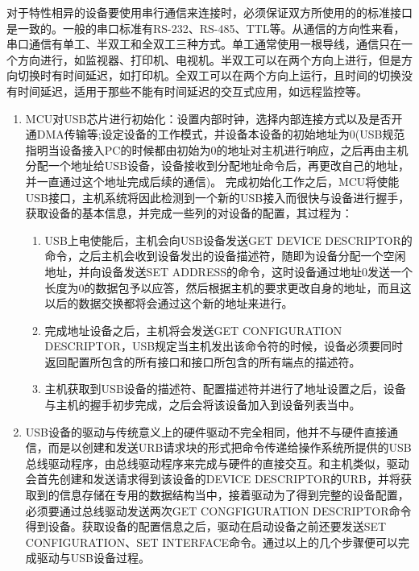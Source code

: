 {	对于特性相异的设备要使用串行通信来连接时，必须保证双方所使用的的标准接口是一致的。一般的串口标准有RS-232、RS-485、TTL等。从通信的方向性来看，串口通信有单工、半双工和全双工三种方式。单工通常使用一根导线，通信只在一个方向进行，如监视器、打印机、电视机。半双工可以在两个方向上进行，但是方向切换时有时间延迟，如打印机。全双工可以在两个方向上运行，且时间的切换没有时间延迟，适用于那些不能有时间延迟的交互式应用，如远程监控等。






\begin{enumerate}
\item {}

	MCU对USB芯片进行初始化：设置内部时钟，选择内部连接方式以及是否开通DMA传输等;设定设备的工作模式，并设备本设备的初始地址为0(USB规范指明当设备接入PC的时候都由初始为0的地址对主机进行响应，之后再由主机分配一个地址给USB设备，设备接收到分配地址命令后，再更改自己的地址，并一直通过这个地址完成后续的通信)。
	完成初始化工作之后，MCU将使能USB接口，主机系统将因此检测到一个新的USB接入而很快与设备进行握手，获取设备的基本信息，并完成一些列的对设备的配置，其过程为：
	\begin{enumerate}
	\item USB上电使能后，主机会向USB设备发送GET DEVICE DESCRIPTOR的命令，之后主机会收到设备发出的设备描述符，随即为设备分配一个空闲地址，并向设备发送SET ADDRESS的命令，这时设备通过地址0发送一个长度为0的数据包予以应答，然后根据主机的要求更改自身的地址，而且这以后的数据交换都将会通过这个新的地址来进行。
	\item 完成地址设备之后，主机将会发送GET CONFIGURATION DESCRIPTOR，USB规定当主机发出该命令符的时候，设备必须要同时返回配置所包含的所有接口和接口所包含的所有端点的描述符。
	\item 主机获取到USB设备的描述符、配置描述符并进行了地址设置之后，设备与主机的握手初步完成，之后会将该设备加入到设备列表当中。
	\end{enumerate}
	
	\item {}
	
USB设备的驱动与传统意义上的硬件驱动不完全相同，他并不与硬件直接通信，而是以创建和发送URB请求块的形式把命令传递给操作系统所提供的USB总线驱动程序，由总线驱动程序来完成与硬件的直接交互。和主机类似，驱动会首先创建和发送请求得到该设备的DEVICE DESCRIPTOR的URB，并将获取到的信息存储在专用的数据结构当中，接着驱动为了得到完整的设备配置，必须要通过总线驱动发送两次GET CONGFIGURATION DESCRIPTOR命令得到设备。获取设备的配置信息之后，驱动在启动设备之前还要发送SET CONFIGURATION、SET INTERFACE命令。通过以上的几个步骤便可以完成驱动与USB设备过程。	
\end{enumerate}



}
